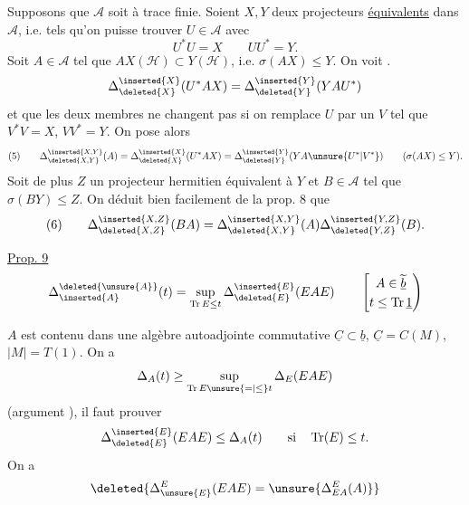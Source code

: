 Supposons  que $\mathcal A$ soit à trace finie. Soient $X,Y$ deux projecteurs  \uline{équivalents} dans $\mathcal A$, i.e. tels qu'on puisse trouver $U\in\mathcal A$ avec
\[
U^*U=X\qquad UU^*=Y.
\]
\margin{$*$}
Soit $A\in\mathcal A$ tel que $AX(\mathcal H)\subset Y(\mathcal H)$, i.e. $\sigma(AX)\leq Y$.  On voit . 
\[
\Delta_{\deleted{X}}^{\inserted{X}}(U^*AX)=\Delta_{\deleted{Y}}^{\inserted{Y}}(YAU^*)
\]
et que les deux membres ne changent pas si on remplace $U$ par un $V$ tel que $V^*V=X$, $VV^*=Y$. On pose alors
\[
(5)\qquad
\Delta_{\deleted{X,Y}}^{\inserted{X,Y}}(A)
=\Delta_{\deleted{X}}^{\inserted{X}}(U^*AX)
=\Delta_{\deleted{Y}}^{\inserted{Y}}(YA\unsure{U^*|V^*})
\qquad(\sigma(AX)\leq Y).
\]
Soit de plus $Z$ un projecteur hermitien équivalent à $Y$ et $B\in\mathcal A$ tel que $\sigma(BY)\leq Z$. On déduit bien facilement de la prop. 8 que
\margin{$=$}
\[
(6)\qquad
\Delta_{\deleted{X,Z}}^{\inserted{X,Z}}(BA)
=\Delta_{\deleted{X,Y}}^{\inserted{X,Y}}(A)
\Delta_{\deleted{Y,Z}}^{\inserted{Y,Z}}(B).
\]
\margin{$=$}

\uline{Prop. 9}\quad{}
\[
\Delta_{\inserted{A}}^{\deleted{\unsure{A}}}(t)
=\sup_{\operatorname{Tr}E\leq t}\Delta_{\deleted{E}}^{\inserted{E}}(EAE)
\qquad\left[\begin{gathered}A\in\widetilde{\underline b}\\t\leq\operatorname{Tr}\underline1\end{gathered}\right)
\]

$A$ est contenu dans une algèbre autoadjointe commutative  $\underline C\subset\underline b$, $\underline C=C(M)$, $|M|=T(1)$. On a
\[
\Delta_A(t)\geq\sup_{\operatorname{Tr}E\unsure{=|\leq}t}\Delta_E(EAE)
\]
(argument ), il faut prouver
\[
\Delta_{\deleted{E}}^{\inserted{E}}(EAE)\leq\Delta_A(t)
\qquad\text{si}\quad \operatorname{Tr}(E)\leq t.
\]
On a
\[
\deleted{\Delta_{\unsure{E}}^E(EAE)=\unsure{\Delta_{EA}^E(A)}}
\]
